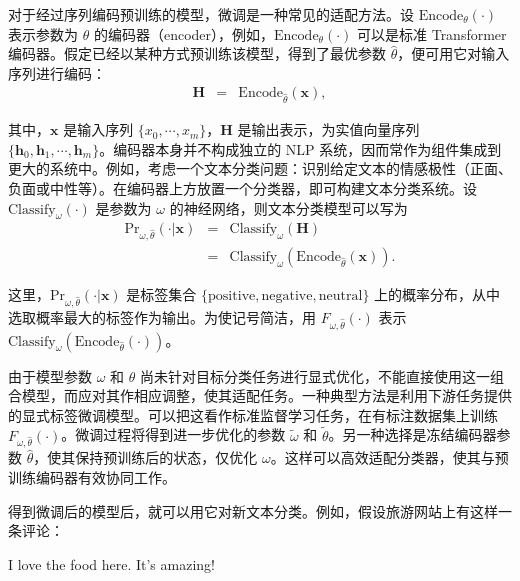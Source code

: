 \noindent 对于经过序列编码预训练的模型，微调是一种常见的适配方法。设 $\mathrm{Encode}_{\theta}(\cdot)$ 表示参数为 $\theta$ 的编码器（encoder），例如，$\mathrm{Encode}_{\theta}(\cdot)$ 可以是标准 Transformer 编码器。假定已经以某种方式预训练该模型，得到了最优参数 $\hat{\theta}$，便可用它对输入序列进行编码：
\begin{eqnarray}
\mathbf{H} & = & \mathrm{Encode}_{\hat{\theta}}(\mathbf{x}),
\end{eqnarray}

\noindent 其中，$\mathbf{x}$ 是输入序列 $\{x_0, \cdots, x_m\}$，$\mathbf{H}$ 是输出表示，为实值向量序列 $\{\mathbf{h}_0,\mathbf{h}_1,\cdots,\mathbf{h}_m\}$。编码器本身并不构成独立的 NLP 系统，因而常作为组件集成到更大的系统中。例如，考虑一个文本分类问题：识别给定文本的情感极性（正面、负面或中性等）。在编码器上方放置一个分类器，即可构建文本分类系统。设 $\mathrm{Classify}_{\omega}(\cdot)$ 是参数为 $\omega$ 的神经网络，则文本分类模型可以写为
\begin{eqnarray}
\mathrm{Pr}_{\omega,\hat{\theta}}(\cdot|\mathbf{x}) & = & \mathrm{Classify}_{\omega}(\mathbf{H}) \nonumber \\
& = & \mathrm{Classify}_{\omega}(\mathrm{Encode}_{\hat{\theta}}(\mathbf{x})).
\end{eqnarray}

\noindent 这里，$\mathrm{Pr}_{\omega,\hat{\theta}}(\cdot|\mathbf{x})$ 是标签集合 $\{\mathrm{positive}, \mathrm{negative}, \mathrm{neutral}\}$ 上的概率分布，从中选取概率最大的标签作为输出。为使记号简洁，用 $F_{\omega,\hat{\theta}}(\cdot)$ 表示 $\mathrm{Classify}_{\omega}(\mathrm{Encode}_{\hat{\theta}}(\cdot))$。

由于模型参数 $\omega$ 和 $\hat{\theta}$ 尚未针对目标分类任务进行显式优化，不能直接使用这一组合模型，而应对其作相应调整，使其适配任务。一种典型方法是利用下游任务提供的显式标签微调模型。可以把这看作标准监督学习任务，在有标注数据集上训练 $F_{\omega,\hat{\theta}}(\cdot)$。微调过程将得到进一步优化的参数 $\tilde{\omega}$ 和 $\tilde{\theta}$。另一种选择是冻结编码器参数 $\hat{\theta}$，使其保持预训练后的状态，仅优化 $\omega$。这样可以高效适配分类器，使其与预训练编码器有效协同工作。

得到微调后的模型后，就可以用它对新文本分类。例如，假设旅游网站上有这样一条评论：

\begin{center}
I love the food here. It's amazing!
\vspace{0.5em}
\end{center}


